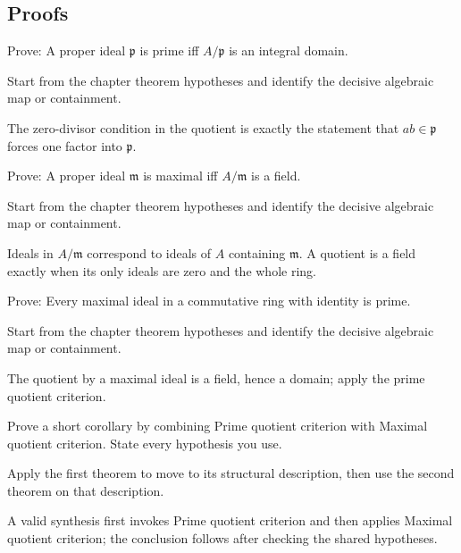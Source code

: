 \subsection*{Proofs}

\begin{exercise}\label{exr:v02-expand-06}
Prove: A proper ideal $\mathfrak p$ is prime iff $A/\mathfrak p$ is an integral domain.
\end{exercise}
\begin{hint}
Start from the chapter theorem hypotheses and identify the decisive algebraic map or containment.
\end{hint}
\begin{solution}
The zero-divisor condition in the quotient is exactly the statement that $ab\in\mathfrak p$ forces one factor into $\mathfrak p$.
\end{solution}

\begin{exercise}\label{exr:v02-expand-07}
Prove: A proper ideal $\mathfrak m$ is maximal iff $A/\mathfrak m$ is a field.
\end{exercise}
\begin{hint}
Start from the chapter theorem hypotheses and identify the decisive algebraic map or containment.
\end{hint}
\begin{solution}
Ideals in $A/\mathfrak m$ correspond to ideals of $A$ containing $\mathfrak m$. A quotient is a field exactly when its only ideals are zero and the whole ring.
\end{solution}

\begin{exercise}\label{exr:v02-expand-08}
Prove: Every maximal ideal in a commutative ring with identity is prime.
\end{exercise}
\begin{hint}
Start from the chapter theorem hypotheses and identify the decisive algebraic map or containment.
\end{hint}
\begin{solution}
The quotient by a maximal ideal is a field, hence a domain; apply the prime quotient criterion.
\end{solution}

\begin{exercise}\label{exr:v02-expand-09}
Prove a short corollary by combining Prime quotient criterion with Maximal quotient criterion. State every hypothesis you use.
\end{exercise}
\begin{hint}
Apply the first theorem to move to its structural description, then use the second theorem on that description.
\end{hint}
\begin{solution}
A valid synthesis first invokes Prime quotient criterion and then applies Maximal quotient criterion; the conclusion follows after checking the shared hypotheses.
\end{solution}

